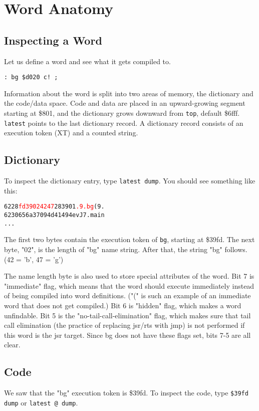 \chapter{Word Anatomy}

\section{Inspecting a Word}

Let us define a word and see what it gets compiled to.

\begin{verbatim}
: bg $d020 c! ;
\end{verbatim}

Information about the word is split into two areas of memory, the dictionary and the code/data space. Code and data are placed in an upward-growing segment starting at \$801, and the dictionary grows downward from \texttt{top}, default \$6fff. \texttt{latest} points to the last dictionary record. A dictionary record consists of an execution token (XT) and a counted string.

\section{Dictionary}
To inspect the dictionary entry, type \texttt{latest dump}. You should see something like this:

\begin{alltt}
6228  \textcolor{red}{fd 39 02 42 47} 28 39 01 \textcolor{red}{.9.bg}(9.
6230  65 6a 37 09 4d 41 49 4e vJ7.main
...
\end{alltt}

The first two bytes contain the execution token of \texttt{bg}, starting at \$39fd. The next byte, "02", is the length of "bg" name string. After that, the string "bg" follows. (42 = 'b', 47 = 'g')

The name length byte is also used to store special attributes of the word. Bit 7 is "immediate" flag, which means that the word should execute immediately instead of being compiled into word definitions. ("(" is such an example of an immediate word that does not get compiled.) Bit 6 is "hidden" flag, which makes a word unfindable. Bit 5 is the "no-tail-call-elimination" flag, which makes sure that tail call elimination (the practice of replacing jsr/rts with jmp) is not performed if this word is the jsr target. Since bg does not have these flags set, bits 7-5 are all clear.

\section{Code}
We saw that the "bg" execution token is \$39fd. To inspect the code, type \texttt{\$39fd dump} or \texttt{latest @ dump}.

